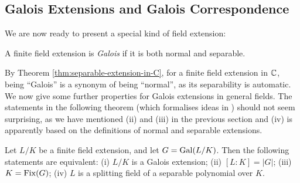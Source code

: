 
 \subsection{Galois Extensions and Galois Correspondence}


We are now ready to present a special kind of field extension:

\begin{definition}
    A finite field extension is \textit{Galois} if it is both normal and separable. 
\end{definition}

By Theorem \ref{thm:separable-extension-in-C}, for a finite field extension in $\mathbb C$, being ``Galois'' is a synonym of being ``normal'', as its separability is automatic. 
We now give some further properties for Galois extensions in general fields. The statements in the following theorem (which formalises ideas in \cite[Lecture~8]{galois-theory-lectures}) should not seem surprising, as we have mentioned (ii) and (iii) in the previous section and (iv) is apparently based on the definitions of normal and separable extensions. 


\begin{theorem} \label{thm:fixed}
	Let $L/K$ be a finite field extension, and let $G = \operatorname{Gal}(L/K)$. Then the following statements are equivalent:
 	(i) $L/K$ is a Galois extension;
	  (ii) $[L:K] = |G|$;
	  (iii) $K = \operatorname{Fix}(G)$;
	  (iv) $L$ is a splitting field of a separable polynomial over $K$.
\end{theorem}

